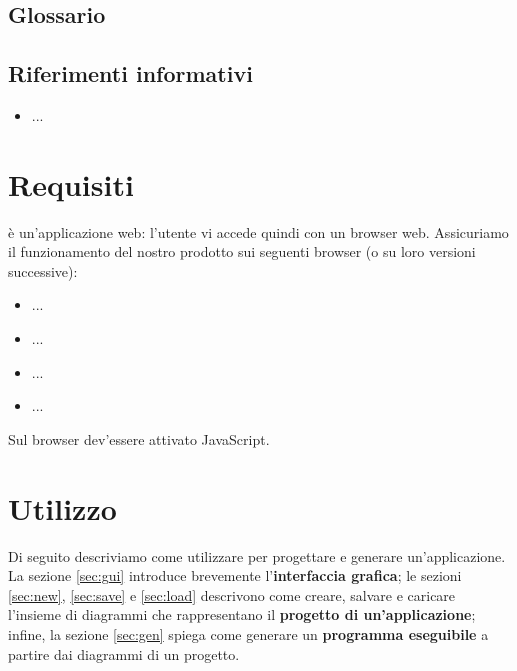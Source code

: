 \subsection{Glossario}
\presgloss

\subsection{Riferimenti informativi}
\begin{itemize}
	\item ...
\end{itemize}






\section{Requisiti} \label{sec:requisiti}

\proj{} è un'applicazione web: l'utente vi accede quindi con un browser web. Assicuriamo il funzionamento del nostro prodotto sui seguenti browser (o su loro versioni successive):
\begin{itemize}
	\item ...
	\item ...
	\item ...
	\item ...
\end{itemize}
Sul browser dev'essere attivato JavaScript.






\section{Utilizzo} \label{sec:utilizzo} %

Di seguito descriviamo come utilizzare \proj{} per progettare e generare un'applicazione. La sezione \ref{sec:gui} introduce brevemente l'\textbf{interfaccia grafica}; le sezioni \ref{sec:new}, \ref{sec:save} e \ref{sec:load} descrivono come creare, salvare e caricare l'insieme di diagrammi che rappresentano il \textbf{progetto di un'applicazione}; infine, la sezione \ref{sec:gen} spiega come generare un \textbf{programma eseguibile} a partire dai diagrammi di un progetto.



